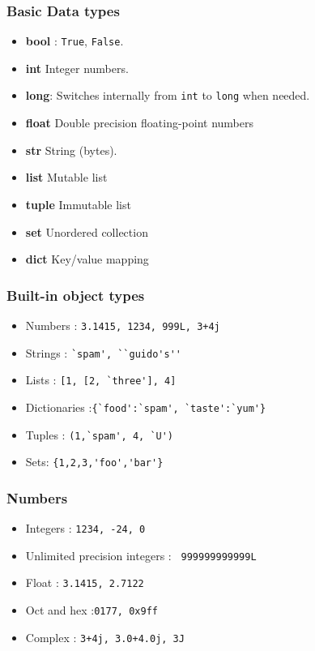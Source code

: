 \begin{frame}[fragile]\frametitle{Basic Data types}
  \begin{itemize}
  \item {\bf bool} : \texttt{True}, \texttt{False}.
  \item {\bf int} Integer numbers.
  \item {\bf long}: Switches internally from \texttt{int} to \texttt{long} when needed.
  \item{\bf float} Double precision floating-point numbers
  \item {\bf str} String (bytes).
  \item{\bf list} Mutable list 
    \item{\bf tuple} Immutable list
        \item{\bf set} Unordered collection
  \item{\bf dict} Key/value mapping
  \end{itemize}
\end{frame}
\begin{frame}[fragile]\frametitle{Built-in object types}
  \begin{itemize}
  \item Numbers : \lstinline{3.1415, 1234, 999L, 3+4j}
  \item Strings : \lstinline{`spam', ``guido's''}
  \item Lists : \lstinline{[1, [2, `three'], 4]}
   \item Dictionaries :\lstinline|{`food':`spam', `taste':`yum'}|
  \item Tuples : \lstinline{(1,`spam', 4, `U')}
  \item Sets: \lstinline|{1,2,3,'foo','bar'}|
  \end{itemize}
\end{frame}


\begin{frame}[fragile]\frametitle{Numbers}
  \begin{itemize}
  \item Integers : \lstinline{1234, -24, 0}
  \item Unlimited precision integers : \lstinline{ 999999999999L}
  \item Float : \lstinline{3.1415, 2.7122}
   \item Oct and hex :\lstinline|0177, 0x9ff|
  \item Complex : \lstinline{3+4j, 3.0+4.0j, 3J}
  \end{itemize}
\end{frame}




